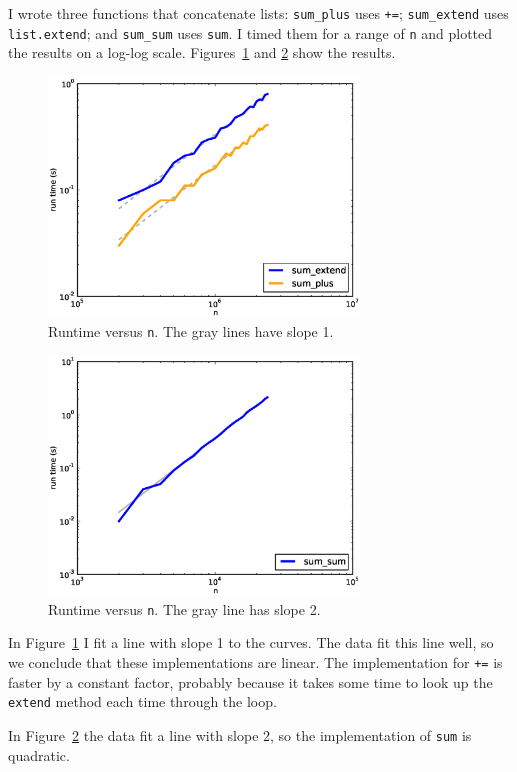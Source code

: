 \documentclass[10pt]{book}
\begin{document}
I wrote three functions that concatenate lists: \verb"sum_plus" uses
{\tt +=}; \verb"sum_extend" uses {\tt list.extend}; and \verb"sum_sum"
uses {\tt sum}.  I timed them for a range of {\tt n} and plotted the
results on a log-log scale.  Figures~\ref{listsum1} and \ref{listsum2} show the
results.

\begin{figure}
\label{listsum1}
\centerline{\includegraphics[height=2.5in]{figs/listsum1.eps}}
\caption{Runtime versus {\tt n}.  The gray lines have slope 1.}
\end{figure}

\begin{figure}
\label{listsum2}
\centerline{\includegraphics[height=2.5in]{figs/listsum2.eps}}
\caption{Runtime versus {\tt n}.  The gray line has slope 2.}
\end{figure}

In Figure~\ref{listsum1} I fit a line with slope 1 to the curves.
The data fit this line well, so we conclude
that these implementations are linear.  The implementation for {\tt +=}
is faster by a constant factor, probably because it takes some time
to look up the {\tt extend} method each time through the loop.

In Figure~\ref{listsum2} the data fit a line with slope 2, so the
implementation of {\tt sum} is quadratic.
\end{document}
